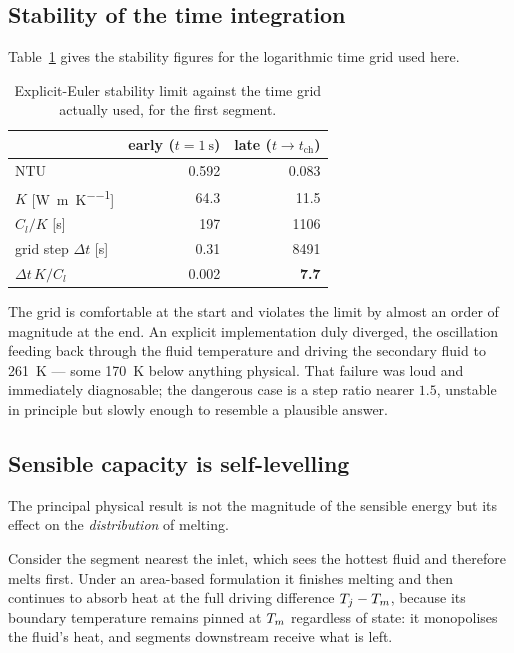\subsection{Stability of the time integration}

Table~\ref{tab:stability} gives the stability figures for the logarithmic time
grid used here.

\begin{table}[htbp]
\centering
\caption{Explicit-Euler stability limit against the time grid actually used,
for the first segment.}
\label{tab:stability}
\begin{tabular}{@{}l r r@{}}
\toprule
 & early ($t=\SI{1}{\second}$) & late ($t\to t_{\mathrm{ch}}$) \\
\midrule
$\mathrm{NTU}$ & \num{0.592} & \num{0.083} \\
$K$ [\si{\watt\per\meter\per\kelvin}] & \num{64.3} & \num{11.5} \\
$C_{l}/K$ [\si{\second}] & \num{197} & \num{1106} \\
grid step $\Delta t$ [\si{\second}] & \num{0.31} & \num{8491} \\
\midrule
$\Delta t\,K/C_{l}$ & \num{0.002} & \textbf{\num{7.7}} \\
\bottomrule
\end{tabular}
\end{table}

\noindent
The grid is comfortable at the start and violates the limit by almost an order
of magnitude at the end. An explicit implementation duly diverged, the
oscillation feeding back through the fluid temperature and driving the secondary
fluid to \SI{261}{\kelvin} --- some \SI{170}{\kelvin} below anything physical.
That failure was loud and immediately diagnosable; the dangerous case is a step
ratio nearer $1.5$, unstable in principle but slowly enough to resemble a
plausible answer.

\subsection{Sensible capacity is self-levelling}
\label{sec:levelling}

The principal physical result is not the magnitude of the sensible energy but
its effect on the \emph{distribution} of melting.

Consider the segment nearest the inlet, which sees the hottest fluid and
therefore melts first. Under an area-based formulation it finishes melting and
then continues to absorb heat at the full driving difference $T_{j}-T_{m}$,
because its boundary temperature remains pinned at $T_{m}$ regardless of state: it
monopolises the fluid's heat, and segments downstream receive what is left.

